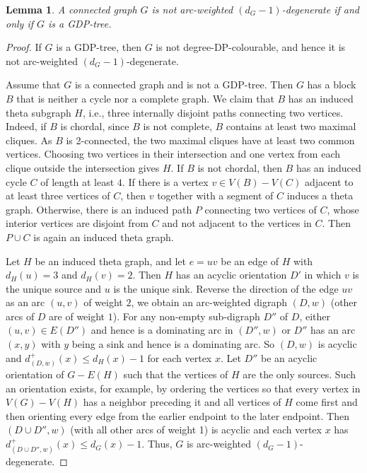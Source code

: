 \documentclass[11pt,a4paper]{article}
\newtheorem{lem}{Lemma}
\theoremstyle{definition}
\begin{document}
\begin{lem}\label{lem-degree}
     A connected graph $G$ is not arc-weighted $(d_G-1)$-degenerate if and only if $G$ is a GDP-tree.
\end{lem}
\begin{proof}
If $G$ is a GDP-tree, then $G$ is not degree-DP-colourable, and hence it is not arc-weighted $(d_G-1)$-degenerate. 


Assume that $G$ is a connected graph and is not a GDP-tree. Then $G$ has a block $B$ that is   neither a cycle nor a complete graph. We claim that $B$ has an induced theta subgraph $H$, i.e., three internally disjoint paths connecting two vertices. Indeed, if $B$ is chordal, since $B$ is not complete, $B$ contains at least two maximal cliques. As $B$ is 2-connected, the two maximal cliques have at least two common vertices. Choosing two vertices in their intersection and one vertex from each clique outside the intersection gives $H$. 
If $B$ is not chordal, then $B$ has an induced cycle $C$ of length at least $4$. If there is a vertex $v \in V(B)-V(C)$ adjacent to at least three vertices of $C$, then $v$ together with a segment of $C$ induces a theta graph. Otherwise, there is an induced path $P$ connecting two vertices of $C$, whose interior vertices are disjoint from $C$ and not adjacent to the vertices in $C$. Then $P \cup C$ is again an induced theta graph. 

 Let $H$ be 
 an induced theta graph, and let   $e=uv$ be an edge of  $H$ with $d_H(u)=3$ and $  d_H(v)=2$. Then $H$ has an acyclic orientation $D'$ 
    in which $v$ is the unique source and $u$ is the unique sink. Reverse the direction of the edge $uv$ as an arc $(u,v)$ of weight $2$, we obtain an arc-weighted digraph $(D,w)$  (other arcs of $D$ are of weight $1$). For any non-empty sub-digraph $D''$ of $D$, either $(u,v) \in E(D'')$ and hence is a dominating arc in $(D'', w)$ or $D''$ has an arc $(x,y)$ with $y$ being a sink and hence is a dominating arc. So $(D,w)$  
     is acyclic and $d_{(D,w)}^+(x) \le d_H(x)-1$ for each vertex $x$.
    Let $D''$ be an acyclic orientation of $G-E(H)$ such that the vertices of $H$ are the only sources. Such an orientation exists, for example, by ordering the vertices so that every vertex in $V(G)-V(H)$ has a neighbor preceding it and all vertices of $H$ come first and then orienting every edge from the earlier endpoint to the later endpoint.
    Then $(D \cup D'', w)$ (with all other arcs of weight 1) is acyclic and each vertex $x$ has 
    $d_{(D \cup D'', w)}^+(x) \le d_G(x)-1$. Thus, $G$ is arc-weighted $(d_G-1)$-degenerate.
\end{proof}
\end{document}
